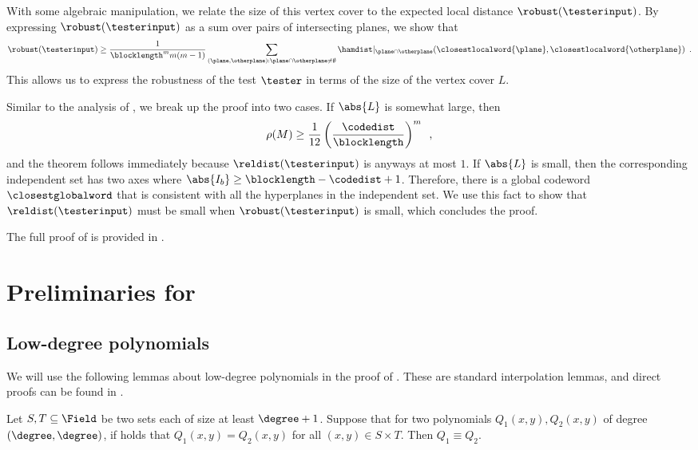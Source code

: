 \documentclass{toc}
\theoremstyle{plain}
\begin{document}
With some algebraic manipulation, we relate the size of this vertex cover to the expected local distance $\robust(\testerinput)$. By expressing $\robust(\testerinput)$ as a sum over pairs of intersecting planes, we show that
\begin{equation*}
\robust(\testerinput) \geq  \frac{1}{\blocklength^{m} m(m-1)} \sum_{(\plane, \otherplane) : \plane \cap \otherplane \ne \emptyset} \hamdist \vert_{\plane \cap \otherplane} (\closestlocalword{\plane}, \closestlocalword{\otherplane}) \enspace.
\end{equation*}
This allows us to express the robustness of the test $\tester$ in terms of the size of the vertex cover $L$.

Similar to the analysis of \cite{Viderman12}, we break up the proof into two cases. If $\abs{L}$ is somewhat large,
then
\[
  \rho(M) \geq \frac{1}{12} \left(\frac{\codedist}{\blocklength}\right)^m\enspace,
\]
and the theorem follows immediately because $\reldist(\testerinput)$
is anyways at most $1$. If $\abs{L}$ is small, then the corresponding
independent set has two axes where
$\abs{I_b} \geq \blocklength - \codedist + 1$. Therefore, there is a
global codeword $\closestglobalword$ that is consistent with all the
hyperplanes in the independent set. We use this fact to show that
$\reldist(\testerinput)$ must be small when $\robust(\testerinput)$ is
small, which concludes the proof.

The full proof of  is provided in .

%
%
\section{Preliminaries for }
\label{sec:prelim-bivar}
\subsection{Low-degree polynomials}
We will use the following lemmas about low-degree polynomials in the proof of . These are standard interpolation lemmas, and direct proofs can be found in \cite{PolishchukS94}.

\begin{lemma}\label{lemma:zero poly}
    Let $S,T \subseteq \Field$ be two sets each of size at least $\degree+1$.
    Suppose that for two polynomials $Q_1(x,y), Q_2(x,y)$ of degree $(\degree,\degree)$,
    if holds that $Q_1(x,y) = Q_2(x,y)$ for all $(x,y) \in S \times T$.
    Then $Q_1 \equiv Q_2$.
\end{lemma}
\end{document}
